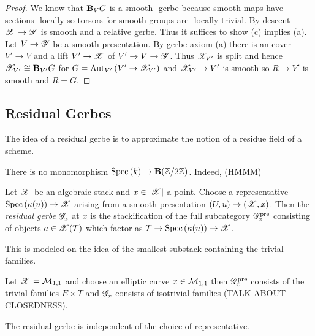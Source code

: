 \documentclass[12pt]{article}
\begin{document}
\begin{proof}
We know that $\B_V G$ is a smooth \etale-gerbe because smooth maps have sections \etale-locally so torsors for smooth groups are \etale-locally trivial. By descent $\X \to \Y$ is smooth and a relative gerbe. Thus it suffices to show (c) implies (a).
\bigskip\\
Let $V \to \Y$ be a smooth presentation. By gerbe axiom (a) there is an \etale cover $V' \to V$ and a lift $V' \to \X$ of $V' \to V \to \Y$. Thus $\X_{V'}$ is split and hence $\X_{V'} \cong \B_{V'} G$ for $G = \Aut[V']{V' \to \X_{V'}}$ and $\X_{V'} \to V'$ is smooth so $R \to V'$ is smooth and $R = G$.
\end{proof}

\subsection{Residual Gerbes}

The idea of a residual gerbe is to approximate the notion of a residue field of a scheme.

\begin{example}
There is no monomorphism $\Spec{k} \to \B (\Z / 2 \Z)$. Indeed, (HMMM)
\end{example}


\newcommand{\pre}{\mathrm{pre}}

\begin{defn}
Let $\X$ be an algebraic stack and $x \in |\X|$ a point. Choose a representative $\Spec{\kappa(u)} \to \X$ arising from a smooth presentation $(U, u) \to (\X, x)$. Then the \textit{residual gerbe} $\G_x$ at $x$ is the stackification of the full subcategory $\G^{\pre}_x$ consisting of objects $a \in \X(T)$ which factor as $T \to \Spec{\kappa(u)} \to \X$.
\end{defn}

\begin{rmk}
This is modeled on the idea of the smallest substack containing the trivial families.
\end{rmk}

\begin{example}
Let $\X = \M_{1,1}$ and choose an elliptic curve $x \in \M_{1,1}$ then $\G^{\pre}_x$ consists of the trivial families $E \times T$ and $\G_x$ consists of isotrivial families (TALK ABOUT CLOSEDNESS).
\end{example}

\begin{prop}
The residual gerbe is independent of the choice of representative.
\end{prop}
\end{document}
